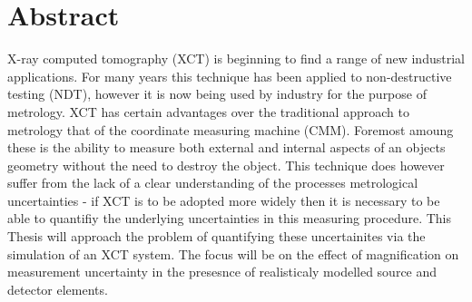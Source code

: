 \chapter*{Abstract}

X-ray computed tomography (XCT) is beginning to find a range of new industrial applications. For many years this technique has been applied to non-destructive testing (NDT), however it is now being used by industry for the purpose of metrology. XCT has certain advantages over the traditional approach to metrology that of the coordinate measuring machine (CMM). Foremost amoung   these is the ability to measure both external and internal aspects of an objects geometry without the need to destroy the object. This technique does however suffer from the lack of a clear understanding of the processes metrological uncertainties - if XCT is to be adopted more widely then it is necessary to be able to quantifiy the underlying uncertainties in this measuring procedure. This Thesis will approach the problem of quantifying these uncertainites via the simulation of an XCT system. The focus will be on the effect of magnification on measurement uncertainty in the presesnce of realisticaly modelled source and detector elements.
